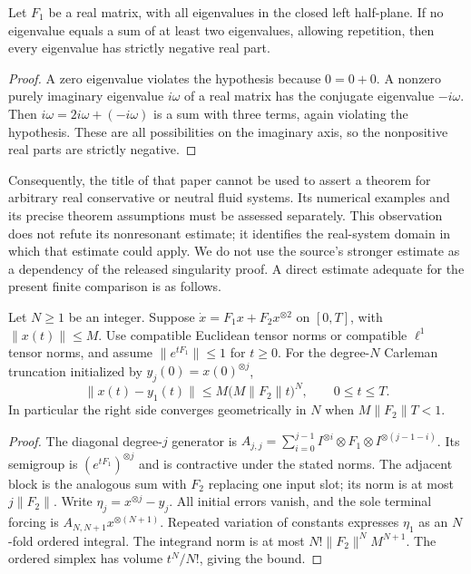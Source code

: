 \begin{proposition}
\label{prop:fluid-real-nonresonance}
Let $F_1$ be a real matrix, with all eigenvalues in the closed left half-plane. If no eigenvalue equals a sum of at least two eigenvalues, allowing repetition, then every eigenvalue has strictly negative real part.
\end{proposition}
\begin{proof}
A zero eigenvalue violates the hypothesis because $0=0+0$. A nonzero purely imaginary eigenvalue $i\omega$ of a real matrix has the conjugate eigenvalue $-i\omega$. Then $i\omega=2i\omega+(-i\omega)$ is a sum with three terms, again violating the hypothesis. These are all possibilities on the imaginary axis, so the nonpositive real parts are strictly negative.
\end{proof}

Consequently, the title of that paper cannot be used to assert a theorem for arbitrary real conservative or neutral fluid systems. Its numerical examples and its precise theorem assumptions must be assessed separately. This observation does not refute its nonresonant estimate; it identifies the real-system domain in which that estimate could apply. We do not use the source's stronger estimate as a dependency of the released singularity proof. A direct estimate adequate for the present finite comparison is as follows.

\begin{proposition}
\label{prop:fluid-carleman-contractivity}
Let $N\ge1$ be an integer. Suppose $\dot x=F_1x+F_2x^{\otimes2}$ on $[0,T]$, with $\|x(t)\|\le M$. Use compatible Euclidean tensor norms or compatible $\ell^1$ tensor norms, and assume $\|e^{tF_1}\|\le1$ for $t\ge0$. For the degree-$N$ Carleman truncation initialized by $y_j(0)=x(0)^{\otimes j}$,
\[
 \|x(t)-y_1(t)\|\le M\bigl(M\|F_2\|t\bigr)^N,
 \qquad 0\le t\le T.
\]
In particular the right side converges geometrically in $N$ when $M\|F_2\|T<1$.
\end{proposition}
\begin{proof}
The diagonal degree-$j$ generator is
$A_{j,j}=\sum_{i=0}^{j-1}I^{\otimes i}\otimes F_1\otimes I^{\otimes(j-1-i)}$.
Its semigroup is $(e^{tF_1})^{\otimes j}$ and is contractive under the stated norms. The adjacent block is the analogous sum with $F_2$ replacing one input slot; its norm is at most $j\|F_2\|$. Write $\eta_j=x^{\otimes j}-y_j$. All initial errors vanish, and the sole terminal forcing is $A_{N,N+1}x^{\otimes(N+1)}$. Repeated variation of constants expresses $\eta_1$ as an $N$-fold ordered integral. The integrand norm is at most
$N!\|F_2\|^N M^{N+1}$. The ordered simplex has volume $t^N/N!$, giving the bound.
\end{proof}

